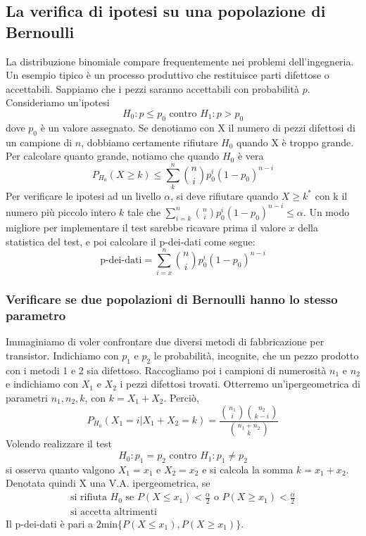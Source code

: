 \documentclass[11pt]{article}
\begin{document}
\subsection{La verifica di ipotesi su una popolazione di Bernoulli}
La distribuzione binomiale compare frequentemente nei problemi dell'ingegneria. Un esempio tipico è un processo produttivo che restituisce parti difettose o accettabili. Sappiamo che i pezzi saranno accettabili con probabilità $p$. Consideriamo un'ipotesi
\begin{displaymath}
    H_0:p \le p_0 \mbox{ contro }H_1: p>p_0
\end{displaymath}
dove $p_0$ è un valore assegnato. Se denotiamo con X il numero di pezzi difettosi di un campione di $n$, dobbiamo certamente rifiutare $H_0$ quando X è troppo grande. Per calcolare quanto grande, notiamo che quando $H_0$ è vera
\begin{displaymath}
    P_{H_0}(X\ge k) \le \sum_k^n {n \choose i} p_0^i (1-p_0)^{n-i}
\end{displaymath}
Per verificare le ipotesi ad un livello $\alpha$, si deve rifiutare quando $X\ge k^*$ con k il numero più piccolo intero $k$ tale che $\sum_{i=k}^n {n \choose i} p_0^i(1-p_0)^{n-i}\le \alpha$. Un modo migliore per implementare il test sarebbe ricavare prima il valore $x$ della statistica del test, e poi calcolare il p-dei-dati come segue:
\begin{displaymath}
    \mbox{p-dei-dati} = \sum_{i=x}^n {n \choose i} p_0^i (1-p_0)^{n-i}
\end{displaymath}
\subsubsection{Verificare se due popolazioni di Bernoulli hanno lo stesso parametro}
Immaginiamo di voler confrontare due diversi metodi di fabbricazione per transistor. Indichiamo con $p_1$ e $p_2$ le probabilità, incognite, che un pezzo prodotto con i metodi 1 e 2 sia difettoso. Raccogliamo poi i campioni di numerosità $n_1$ e $n_2$ e indichiamo con $X_1$ e $X_2$ i pezzi difettosi trovati. Otterremo un'ipergeometrica di parametri $n_1,n_2,k$, con $k=X_1+X_2$. Perciò, 
\begin{displaymath}
    P_{H_0}(X_1=i|X_1+X_2=k)=\frac{{n_1 \choose i}{n_2 \choose k-i}}{{n_1+n_2 \choose k}}
\end{displaymath}
Volendo realizzare il test 
\begin{displaymath}
    H_0: p_1=p_2\mbox{ contro }H_1: p_1 \neq p_2
\end{displaymath}
si osserva quanto valgono $X_1=x_1$ e $X_2=x_2$ e si calcola la somma $k=x_1+x_2$. Denotata quindi X una V.A. ipergeometrica, se 
\begin{gather*}
    \mbox{si rifiuta } H_0\mbox{ se }P(X\le x_1)<\frac{\alpha}{2}\mbox{ o }P(X \ge x_1) < \frac{\alpha}{2}\\ 
    \mbox{si accetta altrimenti}
\end{gather*}
Il p-dei-dati è pari a $2$min$\{P(X\le x_1),P(X \ge x_1)\}$.
\end{document}
